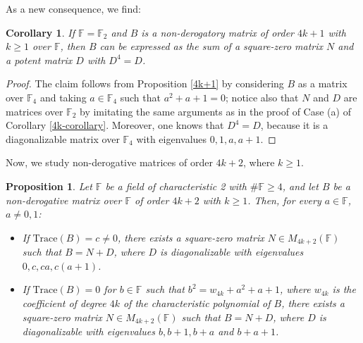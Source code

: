 \documentclass{amsart}
\def\FF{\mathbb{F}}
\newtheorem{proposition}[theorem]{Proposition}
\newtheorem{corollary}[theorem]{Corollary}
\theoremstyle{definition}
\theoremstyle{remark}
\numberwithin{equation}{section}
\begin{document}
As a new consequence, we find:

\begin{corollary}\label{4k+1-corollary}
If $\FF=\FF_2$ and $B$ is a non-derogatory matrix of order $4k+1$ with $k\ge 1$ over $\FF$, then $B$ can be expressed as the sum of a square-zero matrix $N$ and a potent matrix $D$ with $D^4=D$.
\end{corollary}

\begin{proof}
The claim follows from Proposition \ref{4k+1} by considering $B$ as a matrix over $\FF_4$ and taking $a\in \FF_4$ such that $a^2+a+1=0$; notice also that $N$ and $D$ are matrices over $\FF_2$ by imitating the same arguments as in the proof of Case (a) of Corollary \ref{4k-corollary}. Moreover, one knows that $D^4=D$, because it is a diagonalizable matrix over $\FF_4$ with eigenvalues $0,1,a,a+1$.
\end{proof}

Now, we study non-derogative matrices of order $4k+2$, where $k\ge 1$.

\begin{proposition}\label{4k+2}
Let $\FF$ be a field of characteristic 2 with $\#\FF\ge4$, and let $B$ be a non-derogative matrix over $\FF$ of order $4k+2$ with $k\ge 1$. Then, for every $a\in \FF$, $a\ne 0,1$:
\begin{itemize}
\item[(a)] If $\text{Trace}(B)=c\ne 0$, there exists a square-zero matrix $N\in {M}_{4k+2}(\FF)$ such that $B=N+D$, where $D$ is diagonalizable with eigenvalues $0, c, ca,c(a+1)$.
\item[(b)] If $\text{Trace}(B)=0$ for $b\in \mathbb{F}$ such that $b^2 =w_{4k}+a^2+a+1$, where $w_{4k}$ is the coefficient of degree $4k$ of the characteristic polynomial of $B$, there exists a square-zero matrix $N\in {M}_{4k+2}(\FF)$ such that $B=N+D$, where $D$ is diagonalizable with eigenvalues $b,b+1,b+a$ and $b+a+1$.
\end{itemize}
\end{proposition}
\end{document}
